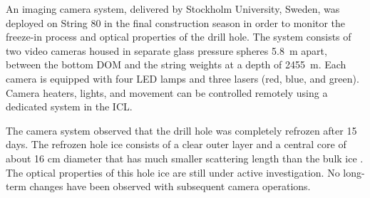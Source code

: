 An imaging camera system, delivered by Stockholm University, Sweden, was deployed on String 80 in the final
construction season in order to monitor the freeze-in process and optical
properties of the drill hole.  The system consists of two video cameras
housed in separate glass pressure spheres \SI{5.8}{m} apart, between the
bottom DOM and the string weights at a depth of \SI{2455}{m}.  Each
camera is equipped with four LED lamps and three lasers (red, blue, and
green).  Camera heaters, lights, and movement can be controlled remotely
using a dedicated system in the ICL.  

The camera system observed that the drill hole was completely refrozen after
15 days.  The refrozen hole ice consists of a clear outer
layer and a central core of about 16 cm diameter that has much
smaller scattering length than the bulk ice \cite{rongen_vlvnt15}.  The
optical properties of this hole ice are still under active investigation.
No long-term changes have been observed with subsequent camera operations.
